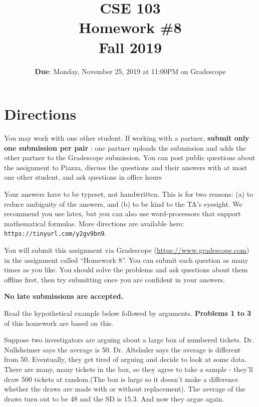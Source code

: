 \documentclass[12pt, oneside]{article}
\title{\bf CSE 103 \\[2ex]
       \Large Homework \#8\\ Fall 2019}
\begin{document}
\date{\textbf{Due}: Monday, November 25, 2019 at 11:00PM on Gradescope}
\maketitle

\section{Directions}
You may work with one other student. If working with a partner,
\textbf{submit only one submission per pair} : one partner uploads the submission and adds the other partner to the Gradescope submission. You can post public questions about the assignment to Piazza, discuss the questions and their answers with at most one other student, and ask questions in office hours

Your answers have to be typeset, not handwritten. This is for two
reasons: (a) to reduce ambiguity of the answers, and (b) to be kind to
the TA's eyesight. We recommend you use latex, but you can also use
word-processors that support mathematical formulas. More directions
are available here: {\tt https://tinyurl.com/y2gv9bn9}.

You will submit this assignment via Gradescope
(\url{https://www.gradescope.com}) in the assignment called ``Homework
8''. You can submit each question as many times as you like. You should solve the problems and ask questions about them offline first, then try submitting once you are confident in your answers. 

\textbf{No late submissions are accepted.}

\newpage
 Read the hypothetical example below followed by arguments. \textbf{Problems 1 to 3} of this homework are based on this.
 \par
 Suppose two investigators are arguing about a large box of numbered tickets. Dr. Nullsheimer says the average is 50. Dr. Altshuler says the average is different from 50. Eventually, they get tired of arguing and decide to look at some data. There are many, many tickets in the box, so they agree to take a sample - they'll draw 500 tickets at random.(The box is large so it doesn't make a difference whether the draws are made with or without replacement). The average of the draws turn out to be 48 and the SD is 15.3. And now they argue again.\\
 
\end{document}
